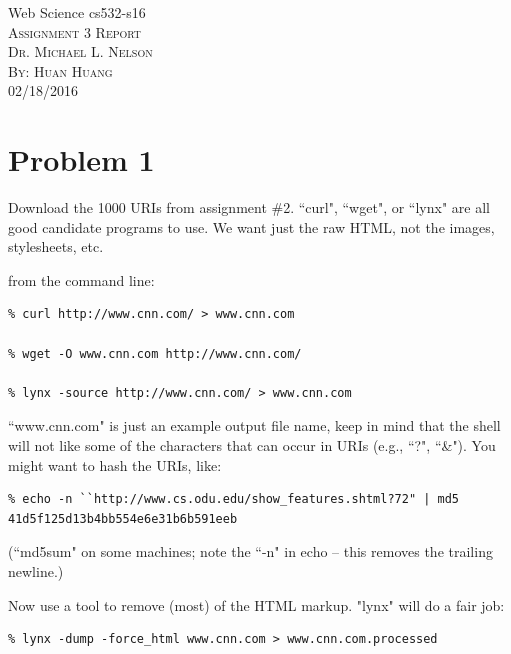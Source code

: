\documentclass[12pt]{article}
\begin{document}
\begin{titlepage}
	\begin{center}
	\Huge{Web Science cs532-s16}\\
	[0.25in]
	\textsc{\Large Assignment 3 Report}\\
	\textsc{\normalsize Dr. Michael L. Nelson}\\
	[4.25in]
	\textsc{\normalsize By: Huan Huang}\\
	\large 02/18/2016\\
	
	
	\end{center}
\end{titlepage}
\newpage


\section*{Problem 1}
Download the 1000 URIs from assignment \#2.  ``curl", ``wget", or
``lynx" are all good candidate programs to use.  We want just the
raw HTML, not the images, stylesheets, etc.

\noindent
from the command line:

\begin{verbatim}
% curl http://www.cnn.com/ > www.cnn.com

% wget -O www.cnn.com http://www.cnn.com/

% lynx -source http://www.cnn.com/ > www.cnn.com
\end{verbatim}

\noindent
``www.cnn.com" is just an example output file name, keep in mind
that the shell will not like some of the characters that can occur
in URIs (e.g., ``?", ``\&").  You might want to hash the URIs, like:

\begin{verbatim}
% echo -n ``http://www.cs.odu.edu/show_features.shtml?72" | md5
41d5f125d13b4bb554e6e31b6b591eeb
\end{verbatim}

\noindent
(``md5sum" on some machines; note the ``-n" in echo -- this removes
the trailing newline.) 

\noindent
Now use a tool to remove (most) of the HTML markup.  "lynx" will
do a fair job:

\begin{verbatim}
% lynx -dump -force_html www.cnn.com > www.cnn.com.processed
\end{verbatim}
\end{document}
